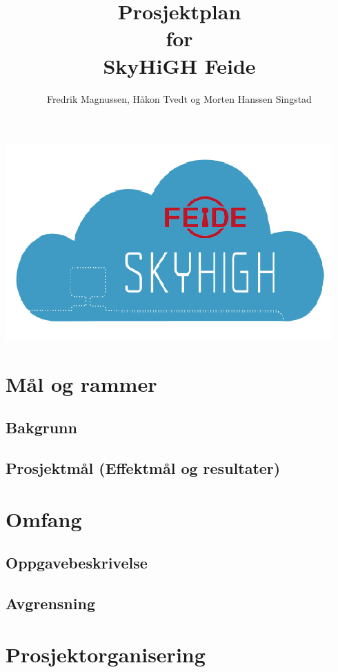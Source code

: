 \documentclass[12pt,a4paper]{article}
\begin{document}
\title{Prosjektplan \\ for \\ SkyHiGH Feide}
\author{Fredrik Magnussen, Håkon Tvedt og Morten Hanssen Singstad}
\maketitle
\begin{center}
	\includegraphics[scale=1]{logo.png}
\end{center}

\newpage
\tableofcontents

\newpage
\section{Mål og rammer}
\subsection{Bakgrunn}
\subsection{Prosjektmål (Effektmål og resultater)}

\section{Omfang}
\subsection{Oppgavebeskrivelse}
\subsection{Avgrensning}

\section{Prosjektorganisering}
\end{document}
